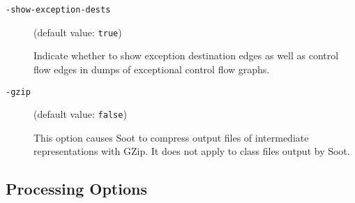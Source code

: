 \documentclass{article}
\begin{document}
\begin{description}
  \item[
  {\tt -show-exception-dests}]

(default value: {\tt true})

Indicate whether to show exception destination edges as
well as control flow edges in
dumps of exceptional control flow graphs.



  \item[
  {\tt -gzip}]

(default value: {\tt false})

This option causes Soot to compress output files of intermediate representations
with GZip. It does not apply to class files output by Soot.



\end{description}


\subsection{Processing Options}
\end{document}
